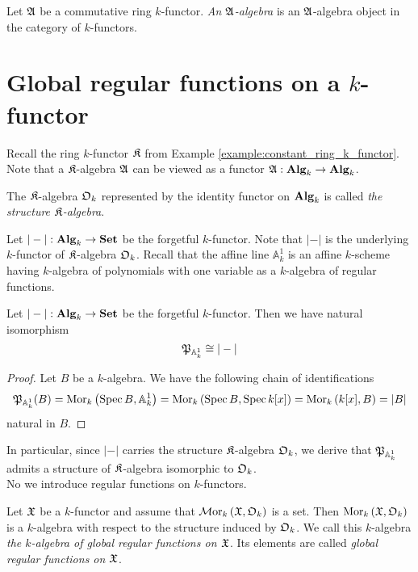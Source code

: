 \begin{definition}
Let ${\mathfrak A}$ be a commutative ring $k$-functor. \textit{An ${\mathfrak A}$-algebra} is an ${\mathfrak A}$-algebra object in the category of $k$-functors.
\end{definition}

\section{Global regular functions on a $k$-functor}
\noindent
Recall the ring $k$-functor ${\mathfrak K}$ from Example \ref{example:constant_ring_k_functor}. Note that a ${\mathfrak K}$-algebra ${\mathfrak A}$ can be viewed as a functor ${\mathfrak A}:\mathbf{Alg}_k\rightarrow \mathbf{Alg}_k$.

\begin{definition}
The ${\mathfrak K}$-algebra ${\mathfrak O}_k$ represented by the identity functor on $\mathbf{Alg}_k$ is called \textit{the structure ${\mathfrak K}$-algebra}.
\end{definition}
\noindent
Let $|-|:\mathbf{Alg}_k\rightarrow \mathbf{Set}$ be the forgetful $k$-functor. Note that $|-|$ is the underlying $k$-functor of ${\mathfrak K}$-algebra ${\mathfrak O}_k$. Recall that the affine line $\mathbb{A}^1_k$ is an affine $k$-scheme having $k$-algebra of polynomials with one variable as a $k$-algebra of regular functions.

\begin{fact}\label{fact:affineline_as_forgetfulfunctor}
Let $|-|:\mathbf{Alg}_k\rightarrow \mathbf{Set}$ be the forgetful $k$-functor. Then we have natural isomorphism
$${\mathfrak P}_{\mathbb{A}^1_k} \cong |-|$$
\end{fact}
\begin{proof}
Let $B$ be a $k$-algebra. We have the following chain of identifications
$${\mathfrak P}_{\mathbb{A}^1_k}(B) = \mathrm{Mor}_k\left(\mathrm{Spec}\, B, \mathbb{A}^1_k\right) = \mathrm{Mor}_k\left(\mathrm{Spec}\, B, \mathrm{Spec}\, k[x]\right) = \mathrm{Mor}_k\left(k[x], B\right) = |B|$$
natural in $B$.
\end{proof}
\noindent
In particular, since $|-|$ carries the structure ${\mathfrak K}$-algebra ${\mathfrak O}_k$, we derive that ${\mathfrak P}_{\mathbb{A}^1_k}$ admits a structure of ${\mathfrak K}$-algebra isomorphic to ${\mathfrak O}_k$.\\
No we introduce regular functions on $k$-functors.

\begin{definition}
Let ${\mathfrak X}$ be a $k$-functor and assume that $\mathcal{M}\mathrm{or}_k\left({\mathfrak X}, {\mathfrak O}_k\right)$ is a set. Then $\mathrm{Mor}_k\left({\mathfrak X}, {\mathfrak O}_k\right)$ is a $k$-algebra with respect to the structure induced by ${\mathfrak O}_k$. We call this $k$-algebra \textit{the $k$-algebra of global regular functions on ${\mathfrak X}$}. Its elements are called \textit{global regular functions on ${\mathfrak X}$}.
\end{definition}

